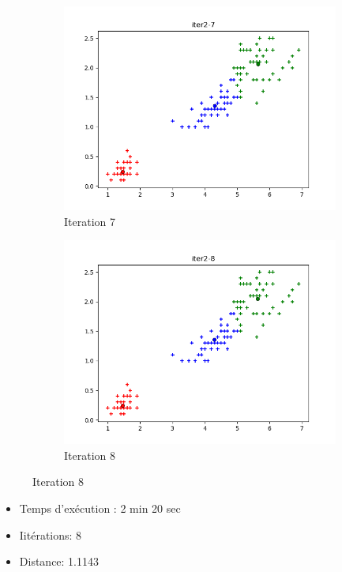 \documentclass[french]{article}
\begin{document}
\begin{figure}[h!]
\centering
\begin{subfigure}{.5\textwidth}
  \centering
  \includegraphics[width=\linewidth]{img/iter2-7.png}
  \caption{Iteration 7}
\end{subfigure}%
\begin{subfigure}{.5\textwidth}
  \centering
  \includegraphics[width=\linewidth]{img/iter2-8.png}
  \caption{Iteration 8}
\end{subfigure}%
\end{figure}


\begin{itemize}
\item Temps d'exécution : 2 min 20 sec
\item Iitérations: 8
\item Distance: 1.1143
\end{itemize}
\end{document}
